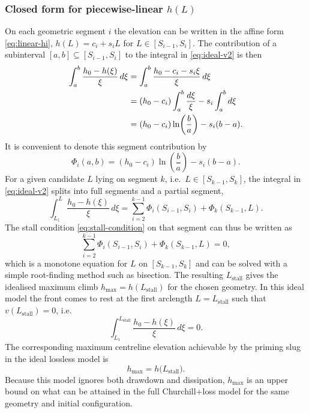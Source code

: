 \documentclass[11pt]{article}
\begin{document}
\subsubsection*{Closed form for piecewise-linear $h(L)$}
On each geometric segment $i$ the elevation can be written in the affine form
\eqref{eq:linear-hi}, $h(L)=c_i+s_iL$ for $L\in [S_{i-1},S_i]$. The contribution of a
subinterval $[a,b]\subseteq [S_{i-1},S_i]$ to the integral in \eqref{eq:ideal-v2} is then
\begin{align}
  \int_{a}^{b} \frac{h_0 - h(\xi)}{\xi}\,d\xi
  &= \int_a^b \frac{h_0 - c_i - s_i\xi}{\xi}\,d\xi \notag\\
  &= (h_0-c_i)\int_a^b \frac{d\xi}{\xi} - s_i\int_a^b d\xi \notag\\
  &= (h_0-c_i)\ln\!\left(\frac{b}{a}\right) - s_i(b-a).
\end{align}
It is convenient to denote this segment contribution by
\begin{equation}
  \Phi_i(a,b) = (h_0-c_i)\ln\!\left(\frac{b}{a}\right) - s_i(b-a).
  \label{eq:Phi}
\end{equation}
For a given candidate $L$ lying on segment $k$, i.e.\ $L\in [S_{k-1},S_k]$, the integral in
\eqref{eq:ideal-v2} splits into full segments and a partial segment,
\begin{equation}
  \int_{L_1}^{L} \frac{h_0 - h(\xi)}{\xi}\,d\xi
  = \sum_{i=2}^{k-1} \Phi_i(S_{i-1},S_i) + \Phi_k(S_{k-1},L).
\end{equation}
The stall condition \eqref{eq:stall-condition} on that segment can thus be written as
\begin{equation}
  \sum_{i=2}^{k-1} \Phi_i(S_{i-1},S_i) + \Phi_k(S_{k-1},L) = 0,
  \label{eq:stall-piecewise}
\end{equation}
which is a monotone equation for $L$ on $[S_{k-1},S_k]$ and can be solved with a simple
root-finding method such as bisection. The resulting $L_{\text{stall}}$ gives the idealised
maximum climb $h_{\max}=h(L_{\text{stall}})$ for the chosen geometry.
In this ideal model the front comes to rest at the first arclength $L = L_{\text{stall}}$ such that
$v(L_{\text{stall}}) = 0$, i.e.
\begin{equation}
  \int_{L_1}^{L_{\text{stall}}} \frac{h_0 - h(\xi)}{\xi}\,d\xi = 0.
  \label{eq:stall-condition}
\end{equation}
The corresponding maximum centreline elevation achievable by the priming slug in the ideal
lossless model is
\begin{equation}
  h_{\max} = h\bigl(L_{\text{stall}}\bigr).
  \label{eq:hmax}
\end{equation}
Because this model ignores both drawdown and dissipation, $h_{\max}$ is an upper bound on
what can be attained in the full Churchill+loss model for the same geometry and initial
configuration.
\end{document}
